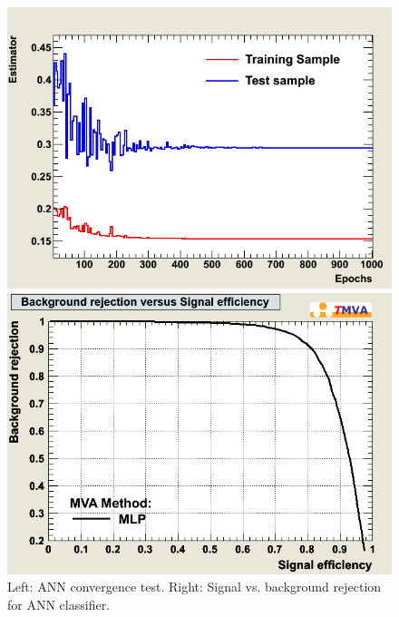  
\begin{figure}[h]
 \begin{minipage}{7.0cm}
\includegraphics[width=1.0\textwidth]{images/ahAnnconvergencetest.png}
\end{minipage}
 \hfill
\begin{minipage}{7.0cm}
\includegraphics[width=1.0\textwidth]{images/ahRejBvsS.png}
\end{minipage}
\begin{minipage}{3.0cm}
\caption{Left: ANN convergence test. Right: Signal vs. background rejection for ANN classifier.}
\end{minipage}
\label{fig:mlp}
\end{figure}


\clearpage


